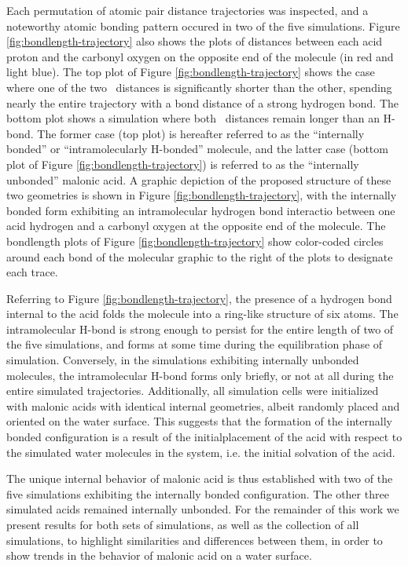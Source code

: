 Each permutation of atomic pair distance trajectories was inspected, and a noteworthy atomic bonding pattern occured in two of the five simulations. Figure \ref{fig:bondlength-trajectory} also shows the plots of distances between each acid proton and the carbonyl oxygen on the opposite end of the molecule (in red and light blue). The top plot of Figure \ref{fig:bondlength-trajectory} shows the case where one of the two \ocarb~distances is significantly shorter than the other, spending nearly the entire trajectory with a bond distance of a strong hydrogen bond. The bottom plot shows a simulation where both \ocarb~distances remain longer than an H-bond. The former case (top plot) is hereafter referred to as the ``internally bonded'' or ``intramolecularly H-bonded'' molecule, and the latter case (bottom plot of Figure \ref{fig:bondlength-trajectory}) is referred to as the ``internally unbonded'' malonic acid. A graphic depiction of the proposed structure of these two geometries is shown in Figure \ref{fig:bondlength-trajectory}, with the internally bonded form exhibiting an intramolecular hydrogen bond interactio between one acid hydrogen and a carbonyl oxygen at the opposite end of the molecule. The bondlength plots of Figure \ref{fig:bondlength-trajectory} show color-coded circles around each bond of the molecular graphic to the right of the plots to designate each trace.

Referring to Figure \ref{fig:bondlength-trajectory}, the presence of a hydrogen bond internal to the acid folds the molecule into a ring-like structure of six atoms. The intramolecular H-bond is strong enough to persist for the entire length of two of the five simulations, and forms at some time during the equilibration phase of simulation. Conversely, in the simulations exhibiting internally unbonded molecules, the intramolecular H-bond forms only briefly, or not at all during the entire simulated trajectories. Additionally, all simulation cells were initialized with malonic acids with identical internal geometries, albeit randomly placed and oriented on the water surface. This suggests that the formation of the internally bonded configuration is a result of the initialplacement of the acid with respect to the simulated water molecules in the system, i.e. the initial solvation of the acid.

The unique internal behavior of malonic acid is thus established with two of the five simulations exhibiting the internally bonded configuration. The other three simulated acids remained internally unbonded. For the remainder of this work we present results for both sets of simulations, as well as the collection of all simulations, to highlight similarities and differences between them, in order to show trends in the behavior of malonic acid on a water surface.

